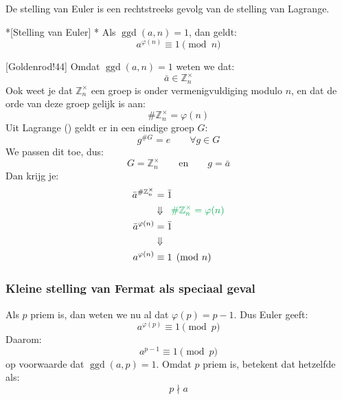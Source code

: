 
De stelling van Euler is een rechtstreeks gevolg van de stelling van Lagrange.

\begin{nicetheorem}*[Stelling van Euler]\label{l6_stelling-euler}
    \nextpart[]*
    Als $\operatorname{ggd}(a,n)=1$, dan geldt:
    \begin{equation*}
        a^{\varphi(n)} \equiv 1 \pmod n
    \end{equation*}
\end{nicetheorem}

[Goldenrod!44] Omdat $\operatorname{ggd}(a,n)=1$ weten we dat:
\begin{equation*}
    \bar{a} \in \mathbb{Z}_n^{\times}
\end{equation*}
Ook weet je dat $\mathbb{Z}_n^{\times}$ een groep is onder vermenigvuldiging modulo $n$, en dat de orde van deze groep gelijk is aan:
\begin{equation*}
    \#\mathbb{Z}_n^{\times} = \varphi(n)
\end{equation*}
Uit Lagrange () geldt er in een eindige groep $G$:
\begin{equation*}
    g^{\#G} = e \qquad \forall g \in G
\end{equation*}
We passen dit toe, dus:
\begin{equation*}
    G = \mathbb{Z}_n^{\times} \qquad \text{en} \qquad g = \bar{a}
\end{equation*}
Dan krijg je:
\begin{equation*}
    \begin{aligned}
        \bar{a}^{\#\mathbb{Z}_n^{\times}} &= \bar{1} \\
        &\Downarrow \textcolor{Green}{\;\; \#\mathbb{Z}_n^{\times} = \varphi(n)} \\
        \bar{a}^{\varphi(n)} &= \bar{1} \\
        &\Downarrow \\
        a^{\varphi(n)} &\equiv 1 \pmod n
    \end{aligned}
\end{equation*}

\subsubsection{Kleine stelling van Fermat als speciaal geval}

Als $p$ priem is, dan weten we nu al dat $\varphi(p) = p-1$. Dus Euler geeft:
\begin{equation*}
    a^{\varphi(p)} \equiv 1 \pmod p
\end{equation*}
Daarom:
\begin{equation*}
    a^{p-1} \equiv 1 \pmod p
\end{equation*}
op voorwaarde dat $\operatorname{ggd}(a,p) = 1$. Omdat $p$ priem is, betekent dat hetzelfde als:
\begin{equation*}
    p \nmid a
\end{equation*}

